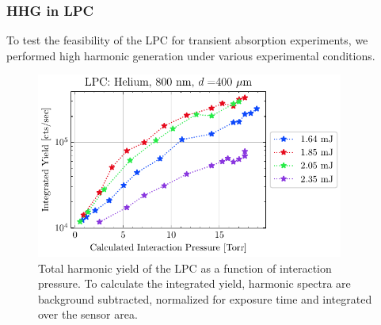 




\subsubsection{HHG in LPC}

To test the feasibility of the LPC for transient absorption experiments, we performed high harmonic generation under various experimental conditions.

\begin{figure}
	\centering
	\includegraphics[width=0.90\textwidth]{figures/chap3/LPC_P_scaling_He800.pdf}
	\caption{Total harmonic yield of the LPC as a function of interaction pressure. To calculate the integrated yield, harmonic spectra are background subtracted, normalized for exposure time and integrated over the sensor area.}
	\label{fig:LPC_performance}
\end{figure}

